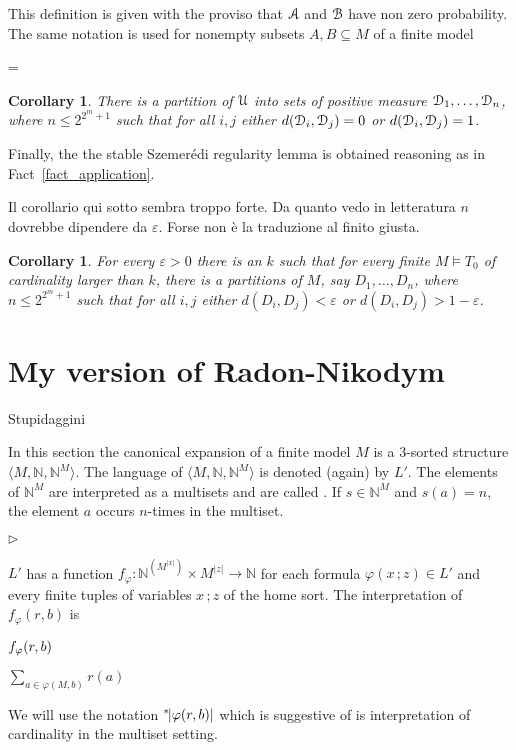 \documentclass[10pt,oneside, openany]{book}
\newcommand{\mylabel}[1]{{\ssf{#1}}\hfill}
\renewenvironment{itemize}
  {\begin{list}{$\triangleright$}{%
   \setlength{\parskip}{0mm}
   \setlength{\topsep}{.4\baselineskip}
   \setlength{\rightmargin}{0mm}
   \setlength{\listparindent}{0mm}
   \setlength{\itemindent}{0mm}
   \setlength{\labelwidth}{2ex}
   \setlength{\itemsep}{.2\baselineskip}
   \setlength{\parsep}{1ex}
   \setlength{\partopsep}{0mm}
   \setlength{\labelsep}{1ex}
   \setlength{\leftmargin}{\labelwidth+\labelsep}
   \let\makelabel\mylabel}}{%
   \end{list}\vspace*{-1.3mm}}
\renewcommand*{\emph}[1]{%
   \smash{\tikz[baseline]\node[rectangle, fill=green!40, rounded corners, inner xsep=0.5ex, inner ysep=0.2ex, anchor=base, minimum height = 2.7ex]{#1};}}
\def\models{\vDash}
\def\NN{\mathds N}
\def\D{\EuScript D}
\def\Aa{\EuScript A}
\def\U{\EuScript U}
\def\B{\EuScript B}
\def\<{\langle}
\def\>{\rangle}
\def\phi{\varphi}
\def\epsilon{\varepsilon}
\def\ssf#1{\textsf{\footnotesize #1}}
\newcounter{thm}[chapter]
\theoremstyle{mio}
\newtheorem{corollary}[thm]{Corollary}
\theoremstyle{liscio}
\def\QED{\noindent\nolinebreak[4]\hfill\rlap{\ \ $\Box$}\medskip}
\def\ns{{}^*\kern-.3ex}
\begin{document}
This definition is given with the proviso that $\Aa$ and $\B$ have non zero probability.
%
The same notation is used for nonempty subsets $A,B\subseteq M$ of a finite model

\ceq{\hfill\emph{$d(A,B)$}}
{=}
{}

\begin{corollary}
  There is a partition of $\U$ into sets of positive measure $\D_1,\dots,\D_n$, where $n\le2^{2^m+1}$ such that for all $i,j$ either $d(\D_i, \D_j)=0$ or $d(\D_i, \D_j)=1$.\QED
\end{corollary}


Finally, the the stable Szemer\'edi regularity lemma is obtained reasoning as in Fact~\ref{fact_application}.


\noindent{}%
%
Il corollario qui sotto sembra troppo forte.
Da quanto vedo in letteratura $n$ dovrebbe dipendere da $\epsilon$. 
Forse non \`e la traduzione al finito giusta.

\begin{corollary} 
  For every $\epsilon>0$ there is an $k$ such that for every finite $M\models T_0$ of cardinality larger than $k$, there is a partitions of $M$, say $D_1,\dots,D_n$, where $n\le2^{2^m+1}$ such that for all $i,j$ either $d(D_i,D_j)<\epsilon$ or $d(D_i,D_j)>1-\epsilon$.
  \QED
\end{corollary}

\section{My version of Radon-Nikodym}\label{samples}

\def\ceq#1#2#3{\parbox[t]{20ex}{$\displaystyle #1$}\medrel{#2}$\displaystyle  #3$}

\noindent{}%
Stupidaggini

In this section the canonical expansion of a finite model $M$ is a $3$-sorted structure $\<M,\NN, \NN^M\>$.
%
The language of $\<M,\NN, \NN^M\>$ is denoted (again) by $L'$.
%
The elements of $\NN^M$ are interpreted as a multisets and are called \emph{samples}.
%
If $s\in\NN^M$ and $s(a)=n$, the element $a$ occurs $n$-times in the multiset. 
\begin{itemize}
  \item[2'.] $L'$ has a function $f_\phi:\NN^{(M^{|x|})}\times M^{|z|}\to\NN$ for each formula $\phi(x\,;z)\in L'$ and every finite tuples of variables $x\,;z$ of the home sort. 
  The interpretation of $f_\phi(r,b)$ is
  
  \ceq{\hfill f_\phi(r,b)}
  {=}
  {\sum_{a\in\phi(M,b)}r(a)}

  We will use the notation $\ns|\phi(r,b)|$ which is suggestive of is interpretation of cardinality in the multiset setting.
\end{itemize}
\end{document}
